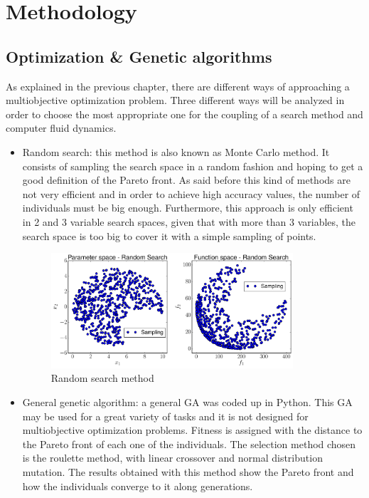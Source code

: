 \chapter{Methodology}

\section{Optimization \& Genetic algorithms}

As explained in the previous chapter, there are different ways of approaching a multiobjective optimization problem. Three different ways will be analyzed in order to choose the most appropriate one for the coupling of a search method and computer fluid dynamics. 

\begin{itemize}
    \item Random search: this method is also known as Monte Carlo method. It consists of sampling the search space in a random fashion and hoping to get a good definition of the Pareto front. As said before this kind of methods are not very efficient and in order to achieve high accuracy values, the number of individuals must be big enough. Furthermore, this approach is only efficient in 2 and 3 variable search spaces, given that with more than 3 variables, the search space is too big to cover it with a simple sampling of points.
    \begin{figure}[h!]
        \centering
        \includegraphics[width=0.85\textwidth]{Figures/3/mode_randomSearch.pdf}
        \caption{Random search method}
        \label{fig:randomSearch}
    \end{figure}
    \item General genetic algorithm: a general GA was coded up in Python. This GA may be used for a great variety of tasks and it is not designed for multiobjective optimization problems. Fitness is assigned with the distance to the Pareto front of each one of the individuals. The selection method chosen is the roulette method, with linear crossover and normal distribution mutation. The results obtained with this method show the Pareto front and how the individuals converge to it along generations.     \begin{figure}[h!]

\end{figure}
\end{itemize}
